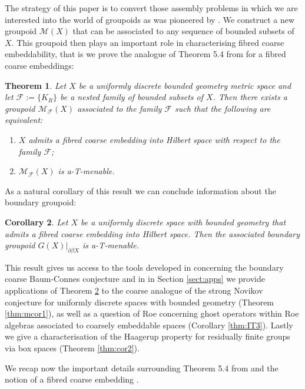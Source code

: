 \documentclass[preprint]{elsarticle}
\theoremstyle{plain}
\newtheorem{theorem}{Theorem}%
\newtheorem{corollary}[theorem]{Corollary}%
\theoremstyle{definition}%
\theoremstyle{remark}%
\begin{document}
The strategy of this paper is to convert those assembly problems in which we are interested into the world of groupoids as was pioneered by \cite{MR1905840}. We construct a new groupoid $\mathcal{M}(X)$ that can be associated to any sequence of bounded subsets of $X$. This groupoid then plays an important role in characterising fibred coarse embeddability, that is we prove the analogue of Theorem 5.4 from \cite{MR1905840} for a fibred coarse embeddings: 

\begin{theorem}\label{Thm:MR1}
Let $X$ be a uniformly discrete bounded geometry metric space and let $\mathcal{F}:=\lbrace K_{R} \rbrace$ be a nested family of bounded subsets of $X$. Then there exists a groupoid $\mathcal{M}_{\mathcal{F}}(X)$ associated to the family $\mathcal{F}$ such that the following are equivalent:
\begin{enumerate}
\item $X$ admits a fibred coarse embedding into Hilbert space with respect to the family $\mathcal{F}$;
\item$\mathcal{M}_{\mathcal{F}}(X)$ is a-T-menable.
\end{enumerate}
\end{theorem}

As a natural corollary of this result we can conclude information about the boundary groupoid:

\begin{corollary}\label{Thm:MT1}
Let $X$ be a uniformly discrete space with bounded geometry that admits a fibred coarse embedding into Hilbert space. Then the associated boundary groupoid $G(X)|_{\partial\beta X}$ is a-T-menable.
\end{corollary}

This result gives us access to the tools developed in \cite{mypub1} concerning the boundary coarse Baum-Connes conjecture and in in Section \ref{sect:apps} we provide applications of Theorem \ref{Thm:MT1} to the coarse analogue of the strong Novikov conjecture for uniformly discrete spaces with bounded geometry (Theorem \ref{thm:mcor1}), as well as a question of Roe concerning ghost operators within Roe algebras associated to coarsely embeddable spaces (Corollary \ref{thm:IT3}). Lastly we give a characterisation of the Haagerup property for residually finite groups via box spaces (Theorem \ref{thm:cor2}).

We recap now the important details surrounding Theorem 5.4 from \cite{MR1905840} and the notion of a fibred coarse embedding \cite{FCEpaper}.
\end{document}
